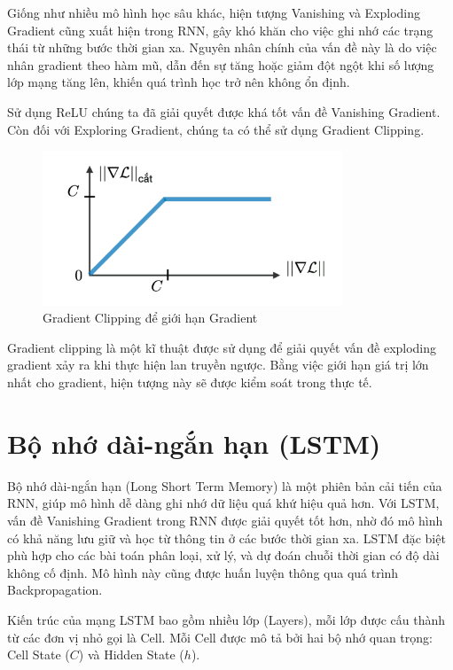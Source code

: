 Giống như nhiều mô hình học sâu khác, hiện tượng Vanishing và Exploding Gradient cũng xuất hiện trong RNN, gây khó khăn cho việc ghi nhớ các trạng thái từ những bước thời gian xa. Nguyên nhân chính của vấn đề này là do việc nhân gradient theo hàm mũ, dẫn đến sự tăng hoặc giảm đột ngột khi số lượng lớp mạng tăng lên, khiến quá trình học trở nên không ổn định.

Sử dụng ReLU chúng ta đã giải quyết được khá tốt vấn đề Vanishing Gradient. Còn đối với Exploring Gradient, chúng ta có thể sử dụng Gradient Clipping.

\begin{figure}[h!]
    \centering
    \includegraphics[width=0.8\textwidth]{images/gradient.png}
    \caption{Gradient Clipping để giới hạn Gradient}
    \label{fig:gradient_clipping}
\end{figure}

Gradient clipping là một kĩ thuật được sử dụng để giải quyết vấn đề exploding gradient xảy ra khi thực hiện lan truyền ngược. Bằng việc giới hạn giá trị lớn nhất cho gradient, hiện tượng này sẽ được kiểm soát trong thực tế.

\section{Bộ nhớ dài-ngắn hạn (LSTM)}
Bộ nhớ dài-ngắn hạn (Long Short Term Memory) là một phiên bản cải tiến của RNN, giúp mô hình dễ dàng ghi nhớ dữ liệu quá khứ hiệu quả hơn. Với LSTM, vấn đề Vanishing Gradient trong RNN được giải quyết tốt hơn, nhờ đó mô hình có khả năng lưu giữ và học từ thông tin ở các bước thời gian xa. LSTM đặc biệt phù hợp cho các bài toán phân loại, xử lý, và dự đoán chuỗi thời gian có độ dài không cố định. Mô hình này cũng được huấn luyện thông qua quá trình Backpropagation.

Kiến trúc của mạng LSTM bao gồm nhiều lớp (Layers), mỗi lớp được cấu thành từ các đơn vị nhỏ gọi là Cell. Mỗi Cell được mô tả bởi hai bộ nhớ quan trọng: Cell State (\(C\)) và Hidden State (\(h\)).

